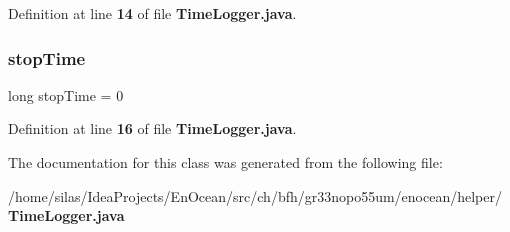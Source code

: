 Definition at line {\bf 14} of file {\bf Time\+Logger.\+java}.

\label{classch_1_1bfh_1_1gr33nopo55um_1_1enocean_1_1helper_1_1TimeLogger_a356ede364ab64bbebb2b17d9c3a172dd} 
\subsubsection{stop\+Time}
{\footnotesize\ttfamily long stop\+Time = 0\hspace{0.3cm}{\ttfamily [private]}}



Definition at line {\bf 16} of file {\bf Time\+Logger.\+java}.



The documentation for this class was generated from the following file\+:\begin{DoxyCompactItemize}
\item 
/home/silas/\+Idea\+Projects/\+En\+Ocean/src/ch/bfh/gr33nopo55um/enocean/helper/{\bf Time\+Logger.\+java}\end{DoxyCompactItemize}
